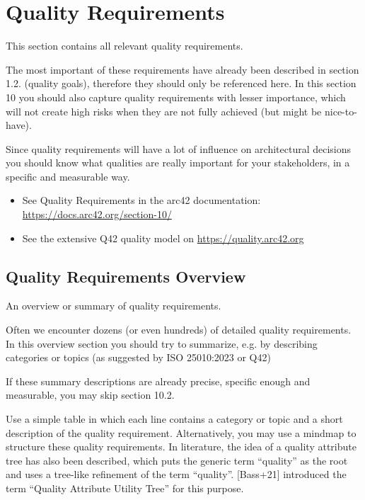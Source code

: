 \section{Quality Requirements}

This section contains all relevant quality requirements.

The most important of these requirements have already been described in section 1.2. (quality goals), therefore they should only be referenced here. In this section 10 you should also capture quality requirements with lesser importance, which will not create high risks when they are not fully achieved (but might be nice-to-have).

Since quality requirements will have a lot of influence on architectural decisions you should know what qualities are really important for your stakeholders, in a specific and measurable way.

\begin{itemize}
  \item See Quality Requirements in the arc42 documentation:
  \href{https://docs.arc42.org/section-10/}{https://docs.arc42.org/section-10/}
  \item See the extensive Q42 quality model on \href{https://quality.arc42.org/}{https://quality.arc42.org}
\end{itemize}


\subsection{Quality Requirements Overview}

An overview or summary of quality requirements.

Often we encounter dozens (or even hundreds) of detailed quality requirements. In this overview section you should try to summarize, e.g. by describing categories or topics (as suggested by ISO 25010:2023 or Q42)

If these summary descriptions are already precise, specific enough and measurable, you may skip section 10.2.

Use a simple table in which each line contains a category or topic and a short description of the quality requirement. Alternatively, you may use a mindmap to structure these quality requirements. In literature, the idea of a quality attribute tree has also been described, which puts the generic term ``quality'' as the root and uses a tree-like refinement of the term ``quality''. [Bass+21] introduced the term ``Quality Attribute Utility Tree'' for this purpose.

